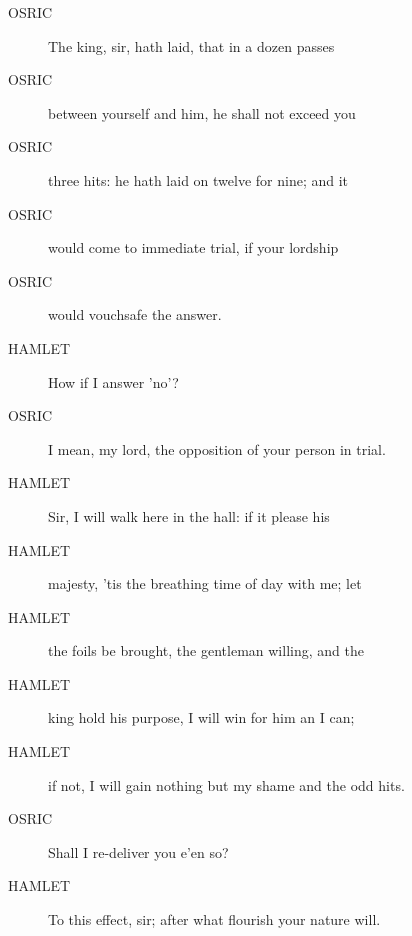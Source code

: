 \documentclass{article}
\begin{document}
\begin{description}
            
\item[OSRIC] The king, sir, hath laid, that in a dozen passes
\item[OSRIC] between yourself and him, he shall not exceed you
\item[OSRIC] three hits: he hath laid on twelve for nine; and it
\item[OSRIC] would come to immediate trial, if your lordship
\item[OSRIC] would vouchsafe the answer.
\end{description}
          
\begin{description}
            
\item[HAMLET] How if I answer 'no'?
\end{description}
          
\begin{description}
            
\item[OSRIC] I mean, my lord, the opposition of your person in trial.
\end{description}
          
\begin{description}
            
\item[HAMLET] Sir, I will walk here in the hall: if it please his
\item[HAMLET] majesty, 'tis the breathing time of day with me; let
\item[HAMLET] the foils be brought, the gentleman willing, and the
\item[HAMLET] king hold his purpose, I will win for him an I can;
\item[HAMLET] if not, I will gain nothing but my shame and the odd hits.
\end{description}
          
\begin{description}
            
\item[OSRIC] Shall I re-deliver you e'en so?
\end{description}
          
\begin{description}
            
\item[HAMLET] To this effect, sir; after what flourish your nature will.
\end{description}
          
\end{document}
